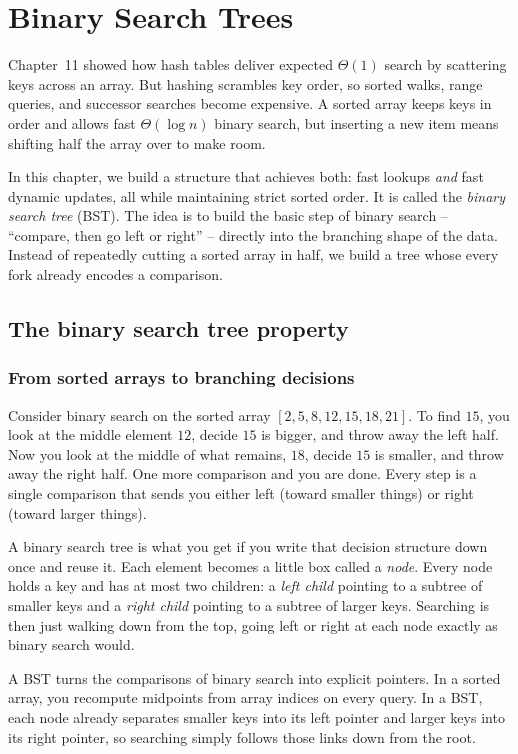 \chapter{Binary Search Trees}

Chapter~11 showed how hash tables deliver expected $\Theta(1)$ search by scattering
keys across an array. But hashing scrambles key order,
so sorted walks, range queries, and successor searches become expensive. A
sorted array keeps keys in order and allows fast $\Theta(\log n)$ binary search, but
inserting a new item means shifting half the array over to make room.

In this chapter, we build a structure that achieves both: fast lookups \emph{and}
fast dynamic updates, all while maintaining strict sorted order. It is called the
\emph{binary search tree} (BST). The idea is to build the basic step of binary
search -- ``compare, then go left or right'' -- directly into the
branching shape of the data. Instead of repeatedly cutting a sorted array in half,
we build a tree whose every fork already encodes a comparison.

\section{The binary search tree property}

\subsection{From sorted arrays to branching decisions}

Consider binary search on the sorted array $[2,5,8,12,15,18,21]$. To find $15$, you look at
the middle element $12$, decide $15$ is bigger, and throw away the left half. Now you look
at the middle of what remains, $18$, decide $15$ is smaller, and throw away the right half.
One more comparison and you are done. Every step is a single comparison that sends you
either left (toward smaller things) or right (toward larger things).

A binary search tree is what you get if you write that decision structure down once and
reuse it. Each element becomes a little box called a \emph{node}. Every node holds a key
and has at most two children: a \emph{left child} pointing to a subtree of smaller keys
and a \emph{right child} pointing to a subtree of larger keys. Searching is then just
walking down from the top, going left or right at each node exactly as binary search
would.

\begin{intuitionbox}
A BST turns the comparisons of binary search into explicit pointers. In a sorted array,
you recompute midpoints from array indices on every query. In a BST, each node already
separates smaller keys into its left pointer and larger keys into its right pointer,
so searching simply follows those links down from the root.
\end{intuitionbox}

